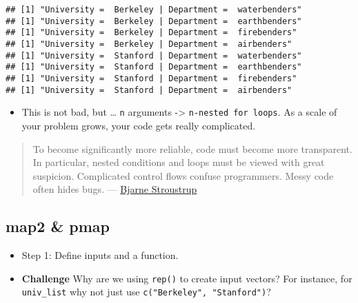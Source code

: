 \documentclass[
]{book}
\providecommand{\tightlist}{%
  \setlength{\itemsep}{0pt}\setlength{\parskip}{0pt}}
\begin{document}
\begin{verbatim}
## [1] "University =  Berkeley | Department =  waterbenders"
## [1] "University =  Berkeley | Department =  earthbenders"
## [1] "University =  Berkeley | Department =  firebenders"
## [1] "University =  Berkeley | Department =  airbenders"
## [1] "University =  Stanford | Department =  waterbenders"
## [1] "University =  Stanford | Department =  earthbenders"
## [1] "University =  Stanford | Department =  firebenders"
## [1] "University =  Stanford | Department =  airbenders"
\end{verbatim}

\begin{itemize}
\tightlist
\item
  This is not bad, but \ldots{} \texttt{n} arguments -\textgreater{} \texttt{n-nested\ for\ loops}. As a scale of your problem grows, your code gets really complicated.
\end{itemize}

\begin{quote}
To become significantly more reliable, code must become more transparent. In particular, nested conditions and loops must be viewed with great suspicion. Complicated control flows confuse programmers. Messy code often hides bugs. --- \href{https://en.wikipedia.org/wiki/Bjarne_Stroustrup}{Bjarne Stroustrup}
\end{quote}

\hypertarget{map2-pmap}{%
\subsection{map2 \& pmap}\label{map2-pmap}}

\begin{itemize}
\item
  Step 1: Define inputs and a function.
\item
  \textbf{Challenge} Why are we using \texttt{rep()} to create input vectors? For instance, for \texttt{univ\_list} why not just use \texttt{c("Berkeley",\ "Stanford")}?
\end{itemize}
\end{document}
